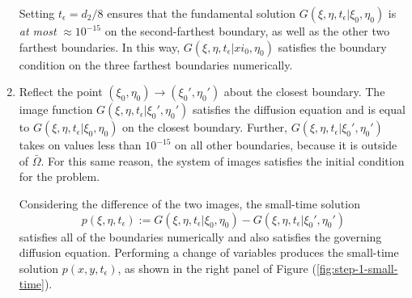 \documentclass[10pt]{article}
\begin{document}
\begin{enumerate}[1.]
  Setting $t_\epsilon = d_2/8$ ensures that the fundamental solution
  $G(\xi,\eta,t_\epsilon | \xi_0, \eta_0)$ is \textit{at most}
  $\approx 10^{-15}$ on the second-farthest boundary, as well as the
  other two farthest boundaries. In this way,
  $G(\xi,\eta,t_\epsilon | xi_0, \eta_0)$ satisfies the boundary
  condition on the three farthest boundaries numerically.

\item Reflect the point $(\xi_0, \eta_0) \to (\xi_0', \eta_0')$ about
  the closest boundary. The image function
  $G(\xi,\eta,t_\epsilon | \xi_0', \eta_0')$ satisfies the diffusion
  equation and is equal to $G(\xi,\eta,t_\epsilon | \xi_0, \eta_0)$ on
  the closest boundary. Further,
  $G(\xi,\eta,t_\epsilon | \xi_0', \eta_0')$ takes on values less than
  $10^{-15}$ on all other boundaries, because it is outside of
  $\bar{\Omega}$. For this same reason, the system of images satisfies
  the initial condition for the problem. 

  Considering the difference of the two images, the small-time solution 
  \[
    p(\xi,\eta,t_\epsilon) := G(\xi,\eta,t_\epsilon | \xi_0, \eta_0) -
    G(\xi,\eta,t_\epsilon | \xi_0', \eta_0')
  \]
  satisfies all of the boundaries numerically and also satisfies the
  governing diffusion equation. Performing a change of variables
  produces the small-time solution $p(x,y,t_\epsilon)$, as shown in
  the right panel of Figure (\ref{fig:step-1-small-time}).
\end{enumerate}
\end{document}
